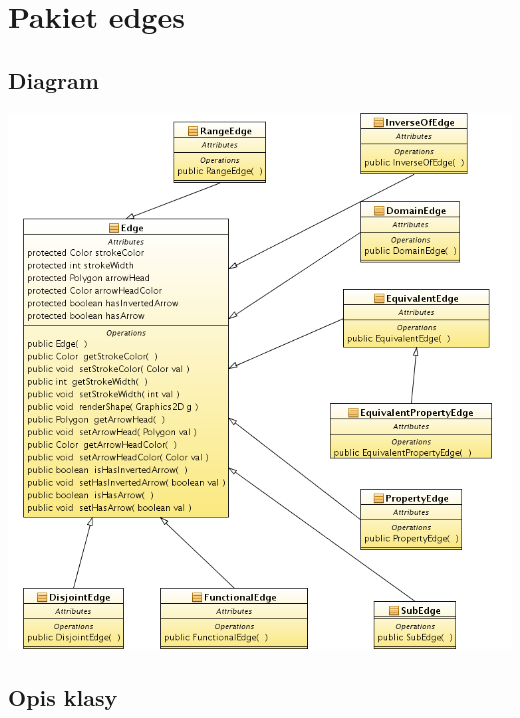 \documentclass[a4paper,10pt]{article}
\begin{document}
\begin{center}
\begin{longtable}{|m{3cm}|m{9cm}|}


\end{longtable}

\end{center}

\section{Pakiet edges}

\subsection{Diagram}

\includegraphics[width=\linewidth]{./modelowanie/OV_UML/EdgeClassDiagram.png}

\subsection{Opis klasy}
\end{document}
